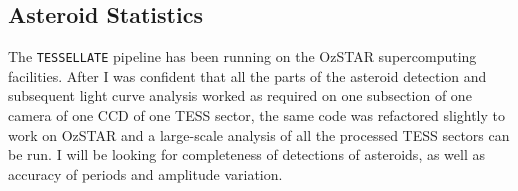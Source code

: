 \documentclass{UCreport}
\begin{document}

\subsection{Asteroid Statistics}\label{SubSec:StatMeth}

The \texttt{TESSELLATE} pipeline has been running on the OzSTAR supercomputing facilities.
After I was confident that all the parts of the asteroid detection and subsequent light curve analysis worked as required on one subsection of one camera of one CCD of one TESS sector, the same code was refactored slightly to work on OzSTAR and a large-scale analysis of all the processed TESS sectors can be run. I will be looking for completeness of detections of asteroids, as well as accuracy of periods and amplitude variation.
\end{document}
